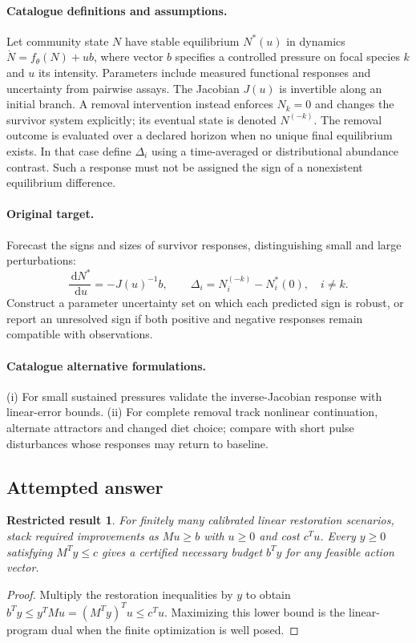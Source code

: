 \documentclass[11pt]{article}
\newcommand{\dd}{\,\mathrm d}
\newtheorem{attemptresult}{Restricted result}[section]
\begin{document}
\paragraph{Catalogue definitions and assumptions.}
Let community state $N$ have stable equilibrium $N^*(u)$ in dynamics $\dot N=f_\theta(N)+u b$, where vector $b$ specifies a controlled pressure on focal species $k$ and $u$ its intensity. Parameters include measured functional responses and uncertainty from pairwise assays. The Jacobian $J(u)$ is invertible along an initial branch. A removal intervention instead enforces $N_k=0$ and changes the survivor system explicitly; its eventual state is denoted $N^{(-k)}$. The removal outcome is evaluated over a declared horizon when no unique final equilibrium exists. In that case define $\Delta_i$ using a time-averaged or distributional abundance contrast. Such a response must not be assigned the sign of a nonexistent equilibrium difference.
\paragraph{Original target.}
Forecast the signs and sizes of survivor responses, distinguishing small and large perturbations:
\[
 \frac{\dd N^*}{\dd u}=-J(u)^{-1}b,
 \qquad
 \Delta_i=N_i^{(-k)}-N_i^*(0),\quad i\ne k.
\]
Construct a parameter uncertainty set on which each predicted sign is robust, or report an unresolved sign if both positive and negative responses remain compatible with observations.
\paragraph{Catalogue alternative formulations.}
(i) For small sustained pressures validate the inverse-Jacobian response with linear-error bounds. (ii) For complete removal track nonlinear continuation, alternate attractors and changed diet choice; compare with short pulse disturbances whose responses may return to baseline.
\subsection{Attempted answer}
\begin{attemptresult}
For finitely many calibrated linear restoration scenarios, stack required improvements as $Mu\geq b$ with $u\geq0$ and cost $c^Tu$. Every $y\geq0$ satisfying $M^Ty\leq c$ gives a certified necessary budget $b^Ty$ for any feasible action vector.
\end{attemptresult}
\begin{proof}
Multiply the restoration inequalities by $y$ to obtain $b^Ty\leq y^TMu=(M^Ty)^Tu\leq c^Tu$. Maximizing this lower bound is the linear-program dual when the finite optimization is well posed.
\end{proof}
\end{document}
